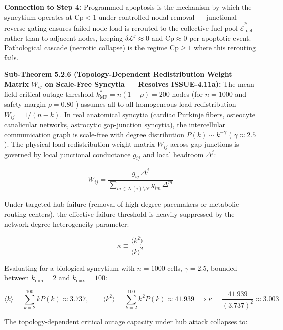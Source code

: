 \documentclass[11pt,a4paper]{article}
\theoremstyle{definition}
\theoremstyle{remark}
\begin{document}
\textbf{Connection to Step 4:} Programmed apoptosis is the mechanism by which the syncytium operates at $\mathrm{Cp} < 1$ under controlled nodal removal — junctional reverse-gating ensures failed-node load is rerouted to the collective fuel pool $\dot{\mathcal{E}}_{\text{fuel}}^{\mathbb{S}}$ rather than to adjacent nodes, keeping $\delta\mathcal{L}^j \approx 0$ and $\mathrm{Cp} \approx 0$ per apoptotic event. Pathological cascade (necrotic collapse) is the regime $\mathrm{Cp} \geq 1$ where this rerouting fails.

\textbf{Sub-Theorem 5.2.6 (Topology-Dependent Redistribution Weight Matrix $W_{ij}$ on Scale-Free Syncytia — Resolves ISSUE-4.11a):}
The mean-field critical outage threshold $k^*_{\text{MF}} = n(1 - \rho) = 200$ nodes (for $n = 1000$ and safety margin $\rho = 0.80$ ) assumes all-to-all homogeneous load redistribution $W_{ij} = 1/(n-k)$. In real anatomical syncytia (cardiac Purkinje fibers, osteocyte canalicular networks, astrocytic gap-junction syncytia), the intercellular communication graph is scale-free with degree distribution $P(k) \sim k^{-\gamma}$ ( $\gamma \approx 2.5$ ). The physical load redistribution weight matrix $W_{ij}$ across gap junctions is governed by local junctional conductance $g_{ij}$ and local headroom $\Delta^j$:


\begin{equation}
W_{ij} = \frac{g_{ij} \, \Delta^j}{\sum_{m \in \mathcal{N}(i) \setminus \mathcal{F}} g_{im} \, \Delta^m}
\end{equation}


Under targeted hub failure (removal of high-degree pacemakers or metabolic routing centers), the effective failure threshold is heavily suppressed by the network degree heterogeneity parameter:


\begin{equation}
\kappa \equiv \frac{\langle k^2 \rangle}{\langle k \rangle^2}
\end{equation}


Evaluating for a biological syncytium with $n = 1000$ cells, $\gamma = 2.5$, bounded between $k_{\min} = 2$ and $k_{\max} = 100$:


\begin{equation}
\langle k \rangle = \sum_{k=2}^{100} k P(k) \approx 3.737, \qquad \langle k^2 \rangle = \sum_{k=2}^{100} k^2 P(k) \approx 41.939 \implies \kappa = \frac{41.939}{(3.737)^2} \approx 3.003
\end{equation}


The topology-dependent critical outage capacity under hub attack collapses to:
\end{document}
